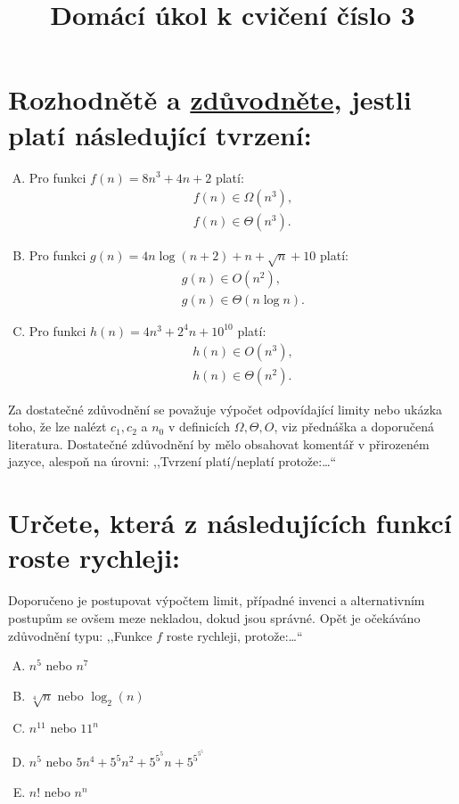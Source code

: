\documentclass[12pt,oneside]{article}
\title{Domácí úkol k cvičení číslo 3}
\author{\vspace{-1em}}
\begin{document}
	\maketitle
	\section{Rozhodnětě a \underline{zdůvodněte}, jestli platí následující tvrzení:}
	\begin{enumerate}[A)]
		\item Pro funkci $f(n) = 8n^3 + 4n + 2$ platí:
		\begin{align}
			f(n) \in \Omega(n^3), \\
			f(n) \in \Theta(n^3).
		\end{align}
		\vspace{2cm}
		\item Pro funkci $g(n) = 4n\log(n+2) + n + \sqrt{n}+ 10$ platí:
		\begin{align}
			g(n) \in O(n^2), \\
			g(n) \in \Theta(n\log n).
		\end{align}
		\vspace{2cm}
		\item Pro funkci $h(n) = 4n^3 + 2^4n + 10^{10} $ platí:
		\begin{align}
			h(n) \in O(n^3) ,\\
			h(n) \in \Theta(n^2).
		\end{align}
	\end{enumerate}
	\vspace{2cm}
	Za dostatečné zdůvodnění se považuje výpočet odpovídající limity nebo ukázka toho, že lze nalézt $c_1, c_2$ a $n_0$ v definicích $\Omega, \Theta, O$, viz přednáška a doporučená literatura.
	Dostatečné zdůvodnění by mělo obsahovat komentář v přirozeném jazyce, alespoň na úrovni: ,,Tvrzení platí/neplatí protože:\dots``

	\section{Určete, která z následujících funkcí roste rychleji:}
	Doporučeno je postupovat výpočtem limit, případné invenci a alternativním postupům se ovšem meze nekladou, dokud jsou správné.
	Opět je očekáváno zdůvodnění typu: ,,Funkce $f$ roste rychleji, protože:\dots``
	\begin{enumerate}[A), itemsep=2.5em]
		\item $n^5$ nebo $n^7$
		\item $\sqrt[4]{n}$ nebo $\log_2(n)$
		\item $n^{11}$ nebo $11^n$
		\item $n^5$ nebo $5n^4 + 5^5n^2 + 5^{5^5}n + 5^{5^{5^5}}$
		\item $n!$ nebo $n^n$
	\end{enumerate}
	\vspace{2.5em}
\end{document}
